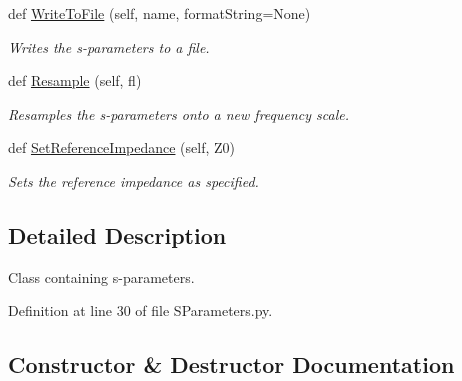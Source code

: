 \begin{DoxyCompactItemize}
def \hyperlink{classSignalIntegrity_1_1SParameters_1_1SParameters_1_1SParameters_add396ed0a719fa2c93037bc8486d2ff1}{Write\+To\+File} (self, name, format\+String=None)
\begin{DoxyCompactList}\small\item\em Writes the s-\/parameters to a file. \end{DoxyCompactList}\item 
def \hyperlink{classSignalIntegrity_1_1SParameters_1_1SParameters_1_1SParameters_a115ed63524d00ebadce833c2106fc7e9}{Resample} (self, fl)
\begin{DoxyCompactList}\small\item\em Resamples the s-\/parameters onto a new frequency scale. \end{DoxyCompactList}\item 
def \hyperlink{classSignalIntegrity_1_1SParameters_1_1SParameters_1_1SParameters_a98bb8cca60faa48d8aa1b2b667c36037}{Set\+Reference\+Impedance} (self, Z0)
\begin{DoxyCompactList}\small\item\em Sets the reference impedance as specified. \end{DoxyCompactList}\end{DoxyCompactItemize}


\subsection{Detailed Description}
Class containing s-\/parameters. 

Definition at line 30 of file S\+Parameters.\+py.



\subsection{Constructor \& Destructor Documentation}
\mbox{\label{classSignalIntegrity_1_1SParameters_1_1SParameters_1_1SParameters_a2590c40d1c3d840ed297c8f1ddcc74a4}} 

